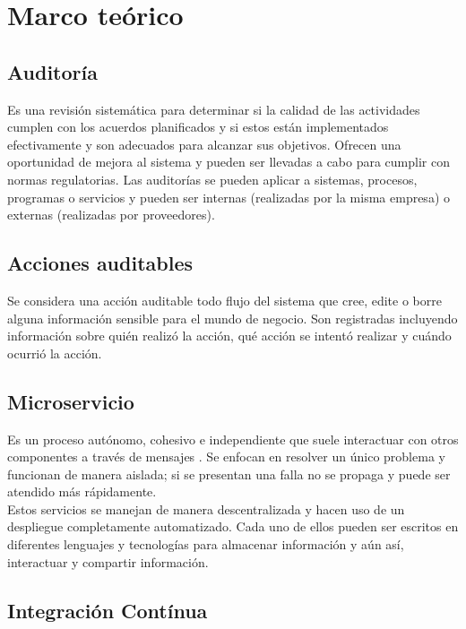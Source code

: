 \chapter{\textbf{Marco teórico}}

\thispagestyle{empty}

\section{Auditoría}

Es una revisión sistemática para determinar si la calidad de las actividades cumplen con los acuerdos planificados y si estos están implementados efectivamente y son adecuados para alcanzar sus objetivos. Ofrecen una oportunidad de mejora al sistema y pueden ser llevadas a cabo para cumplir con normas regulatorias. Las auditorías se pueden aplicar a sistemas, procesos, programas o servicios y pueden ser internas (realizadas por la misma empresa) o externas (realizadas por proveedores). \cite{weinstein1997total}

\section{Acciones auditables}

Se considera una acción auditable todo flujo del sistema que cree, edite o borre alguna información sensible para el mundo de negocio. Son registradas incluyendo información sobre quién realizó la acción, qué acción se intentó realizar y cuándo ocurrió la acción.

\section{Microservicio}

Es un proceso autónomo, cohesivo e independiente que suele interactuar con otros componentes a través de mensajes \cite{Microservices1}. Se enfocan en resolver un único problema y funcionan de manera aislada; si se presentan una falla no se propaga y puede ser atendido más rápidamente. \cite{Microservices2} \\

Estos servicios se manejan de manera descentralizada y hacen uso de un despliegue completamente automatizado. Cada uno de ellos pueden ser escritos en diferentes lenguajes y tecnologías para almacenar información y aún así, interactuar y compartir información. \cite{Microservices3}

\section{Integración Contínua}


